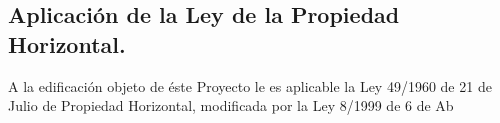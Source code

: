 \subsection{Aplicación de la Ley de la Propiedad Horizontal.}
A la edificación objeto de éste Proyecto le es aplicable la Ley 49/1960 de 21 de Julio de Propiedad Horizontal, modificada por la Ley 8/1999 de 6 de Ab